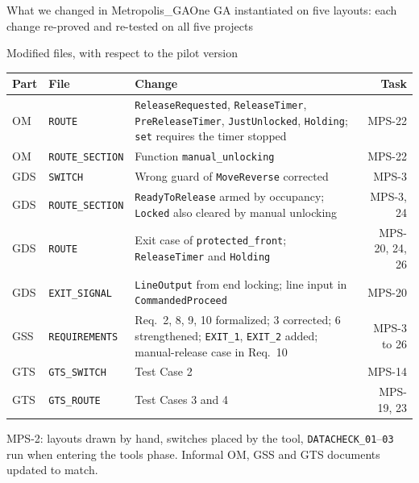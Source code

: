 \documentclass[aspectratio=169,10pt]{beamer}
\newcommand{\smallfont}{\fontsize{7}{8.6}\selectfont}
\newcommand{\tinyfont}{\fontsize{6.2}{7.5}\selectfont}
\begin{document}
\begin{frame}{What we changed in Metropolis\_GA}{One GA instantiated on five layouts: each change re-proved and re-tested on all five projects}
  \vspace{0.8mm}
  \begin{proverbox}[top=0.7mm,bottom=0.7mm]{Modified files, with respect to the pilot version}
    \smallfont
    \renewcommand{\arraystretch}{0.98}
    \begin{tabularx}{\linewidth}{@{}l@{\hspace{2mm}}l@{\hspace{2mm}}L@{\hspace{2mm}}r@{}}
      \toprule
      \textbf{Part} & \textbf{File} & \textbf{Change} & \textbf{Task} \\
      \midrule
      OM  & \texttt{ROUTE} & \texttt{ReleaseRequested}, \texttt{ReleaseTimer}, \texttt{PreReleaseTimer}, \texttt{JustUnlocked}, \texttt{Holding}; \texttt{set} requires the timer stopped & MPS-22 \\
      OM  & \texttt{ROUTE\_SECTION} & Function \texttt{manual\_unlocking} & MPS-22 \\
      GDS & \texttt{SWITCH} & Wrong guard of \texttt{MoveReverse} corrected & MPS-3 \\
      GDS & \texttt{ROUTE\_SECTION} & \texttt{ReadyToRelease} armed by occupancy; \texttt{Locked} also cleared by manual unlocking & MPS-3, 24 \\
      GDS & \texttt{ROUTE} & Exit case of \texttt{protected\_front}; \texttt{ReleaseTimer} and \texttt{Holding} & MPS-20, 24, 26 \\
      GDS & \texttt{EXIT\_SIGNAL} & \texttt{LineOutput} from end locking; line input in \texttt{CommandedProceed} & MPS-20 \\
      GSS & \texttt{REQUIREMENTS} & Req.~2, 8, 9, 10 formalized; 3 corrected; 6 strengthened; \texttt{EXIT\_1}, \texttt{EXIT\_2} added; manual-release case in Req.~10 & MPS-3 to 26 \\
      GTS & \texttt{GTS\_SWITCH} & Test Case 2 & MPS-14 \\
      GTS & \texttt{GTS\_ROUTE} & Test Cases 3 and 4 & MPS-19, 23 \\
      \bottomrule
    \end{tabularx}\par
    \vspace{0.6mm}
    {\tinyfont\color{ProverSlate}MPS-2: layouts drawn by hand, switches placed by the tool, \texttt{DATACHECK\_01}--\texttt{03} run when entering the tools phase. Informal OM, GSS and GTS documents updated to match.\par}
  \end{proverbox}
\end{frame}
\end{document}
